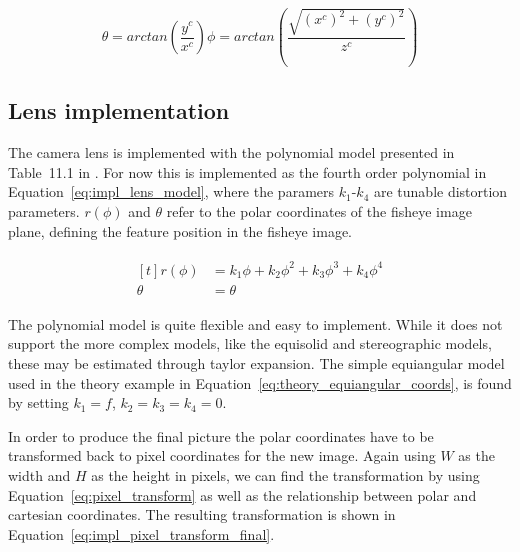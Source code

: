 \begin{subequations}
    \begin{equation}
        \theta = arctan\left(\frac{y^c}{x^c}\right)
        \label{eq:impl_polar_transform_theta}
    \end{equation}
    \begin{equation}
        \phi = arctan\left(\frac{\sqrt{(x^c)^2 + (y^c)^2}}{z^c}\right)
        \label{eq:impl_polar_transform_phi}
    \end{equation}
    \label{eq:impl_polar_transform}
\end{subequations}

\subsection{Lens implementation} \label{sec:lens_modeling}

The camera lens is implemented with the polynomial model presented in Table~11.1 in \cite{FisheyeCorke}. For now this is implemented as the fourth order polynomial in Equation~\eqref{eq:impl_lens_model}, where the paramers $k_1$-$k_4$ are tunable distortion parameters. $r(\phi)$ and $\theta$ refer to the polar coordinates of the fisheye image plane, defining the feature position in the fisheye image.

\begin{align}
    \begin{aligned}[t]
    r(\phi) &= k_1 \phi + k_2 \phi^2 + k_3 \phi^3 + k_4 \phi^4 \\[0.75ex]
    \theta &= \theta
    \end{aligned}
    \label{eq:impl_lens_model}
\end{align}

The polynomial model is quite flexible and easy to implement. While it does not support the more complex models, like the equisolid and stereographic models, these may be estimated through taylor expansion. The simple equiangular model used in the theory example in Equation~\eqref{eq:theory_equiangular_coords}, is found by setting $k_1 = f$, $k_2 = k_3 = k_4 = 0$.

In order to produce the final picture the polar coordinates have to be transformed back to pixel coordinates for the new image. Again using $W$ as the width and $H$ as the height in pixels, we can find the transformation by using Equation~\eqref{eq:pixel_transform} as well as the relationship between polar and cartesian coordinates. The resulting transformation is shown in Equation~\eqref{eq:impl_pixel_transform_final}.

